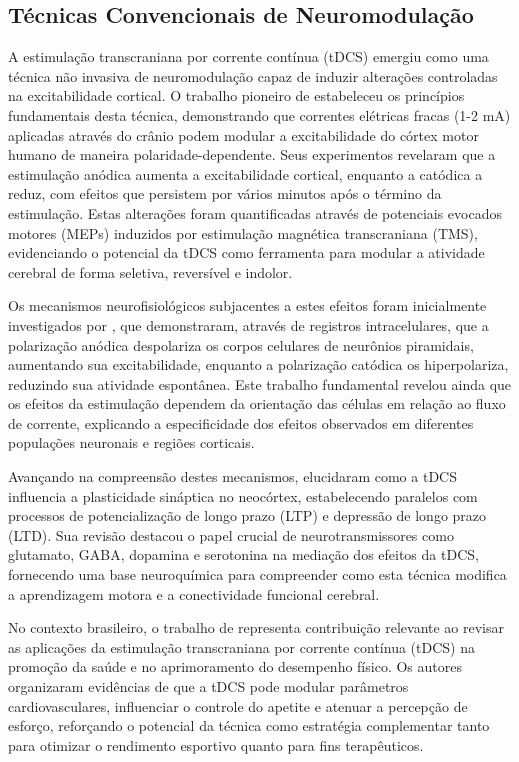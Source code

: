 \subsection{Técnicas Convencionais de Neuromodulação}
A estimulação transcraniana por corrente contínua (tDCS) emergiu como uma técnica não invasiva de neuromodulação capaz de induzir alterações controladas na excitabilidade cortical. O trabalho pioneiro de  estabeleceu os princípios fundamentais desta técnica, demonstrando que correntes elétricas fracas (1-2 mA) aplicadas através do crânio podem modular a excitabilidade do córtex motor humano de maneira polaridade-dependente. Seus experimentos revelaram que a estimulação anódica aumenta a excitabilidade cortical, enquanto a catódica a reduz, com efeitos que persistem por vários minutos após o término da estimulação. Estas alterações foram quantificadas através de potenciais evocados motores (MEPs) induzidos por estimulação magnética transcraniana (TMS), evidenciando o potencial da tDCS como ferramenta para modular a atividade cerebral de forma seletiva, reversível e indolor.

Os mecanismos neurofisiológicos subjacentes a estes efeitos foram inicialmente investigados por , que demonstraram, através de registros intracelulares, que a polarização anódica despolariza os corpos celulares de neurônios piramidais, aumentando sua excitabilidade, enquanto a polarização catódica os hiperpolariza, reduzindo sua atividade espontânea. Este trabalho fundamental revelou ainda que os efeitos da estimulação dependem da orientação das células em relação ao fluxo de corrente, explicando a especificidade dos efeitos observados em diferentes populações neuronais e regiões corticais.

Avançando na compreensão destes mecanismos,  elucidaram como a tDCS influencia a plasticidade sináptica no neocórtex, estabelecendo paralelos com processos de potencialização de longo prazo (LTP) e depressão de longo prazo (LTD). Sua revisão destacou o papel crucial de neurotransmissores como glutamato, GABA, dopamina e serotonina na mediação dos efeitos da tDCS, fornecendo uma base neuroquímica para compreender como esta técnica modifica a aprendizagem motora e a conectividade funcional cerebral.

No contexto brasileiro, o trabalho de  representa contribuição relevante ao revisar as aplicações da estimulação transcraniana por corrente contínua (tDCS) na promoção da saúde e no aprimoramento do desempenho físico. Os autores organizaram evidências de que a tDCS pode modular parâmetros cardiovasculares, influenciar o controle do apetite e atenuar a percepção de esforço, reforçando o potencial da técnica como estratégia complementar tanto para otimizar o rendimento esportivo quanto para fins terapêuticos.

